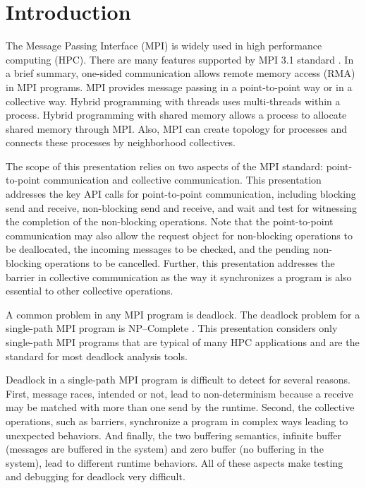 \section{Introduction}

The Message Passing Interface (MPI) is widely used in high performance computing (HPC). 
There are many features supported by MPI 3.1 standard \cite{mpi3.1}. In a brief summary, one-sided communication allows remote memory access (RMA) in MPI programs. MPI provides message passing in a point-to-point way or in a collective way. Hybrid programming with threads uses multi-threads within a process. Hybrid programming with shared memory allows a process to allocate shared memory through MPI. Also, MPI can create topology for processes and connects these processes by neighborhood collectives.  

The scope of this presentation relies on two aspects of the MPI standard: point-to-point communication and collective communication. This presentation addresses the key API calls for point-to-point communication, including blocking send and receive, non-blocking send and receive, and wait and test for witnessing the completion of the non-blocking operations. Note that the point-to-point communication may also allow the request object for non-blocking operations to be deallocated, the incoming messages to be checked, and the pending non-blocking operations to be cancelled. 
Further, this presentation addresses the barrier in collective communication as the way it synchronizes a program is also essential to other collective operations.

A common problem in any MPI program is deadlock. The deadlock problem for a single-path MPI program is NP--Complete \cite{DBLP:conf/fm/ForejtKNS14}.
This presentation considers only single-path MPI programs that are typical of many HPC applications and are the standard for most deadlock analysis tools. 

Deadlock in a single-path MPI program is difficult to detect for several reasons. First, message races, intended or not, lead to non-determinism because a receive may be matched with more than one send by the runtime. Second, the collective operations, such as barriers, synchronize a program in complex ways leading to unexpected behaviors. And finally, the two buffering semantics, infinite buffer (messages are buffered in the system) and zero buffer (no buffering in the system), lead to different runtime behaviors. All of these aspects make testing and debugging for deadlock very difficult. 

